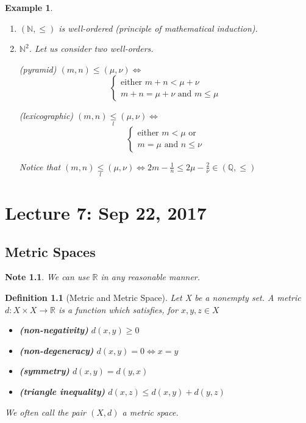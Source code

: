 \documentclass[11pt, oneside]{book}
\theoremstyle{break}
\newtheorem*{note}{Note}
\newtheorem{defn}{Definition}[section]
\newtheorem{eg}{Example}[section]
\newcommand{\bb}[1]{\mathbb{#1}}			%
\begin{document}
\begin{eg}
	\begin{enumerate}
		\item $(\bb{N}, \leq)$ is well-ordered (principle of mathematical induction).
		\item $\bb{N}^2$. Let us consider two well-orders.

			(pyramid) $(m, n) \leq (\mu, \nu) \iff$
			\begin{equation}
				\begin{cases}
					\text{either $m + n < \mu + \nu$} \\
					m + n = \mu + \nu \text{ and } m \leq \mu
				\end{cases}	
			\end{equation}
			
			(lexicographic) $(m, n) \underset{l}{\leq} (\mu, \nu) \iff$
			\begin{equation}
				\begin{cases}
					\text{either } m < \mu \text{ or } \\
					m = \mu \text{ and } n \leq \nu
				\end{cases}
			\end{equation}

			Notice that $(m, n) \underset{l}{\leq} (\mu, \nu) \iff 2m - \frac{1}{n} \leq 2 \mu - \frac{2}{\nu} \in (\bb{Q}, \leq)$
	\end{enumerate}
\end{eg}

\chapter{Lecture 7: Sep 22, 2017}\label{chp:lec7}

\section{Metric Spaces}\label{sect:metric_spaces}

\begin{note}
	We can use $\bb{R}$ in any reasonable manner.
\end{note}

\begin{defn}[Metric and Metric Space]
	Let X be a nonempty set. A metric $d : X \times X \to \bb{R}$ is a function which satisfies, for $x, y, z \in X$
	\begin{itemize}
		\item \textbf{(non-negativity)} $d(x,y) \geq 0$
		\item \textbf{(non-degeneracy)} $d(x,y) = 0 \iff x = y$
		\item \textbf{(symmetry)} $d(x,y) = d(y,x)$
		\item \textbf{(triangle inequality)} $d(x,z) \leq d(x,y) + d(y, z)$
	\end{itemize}

	We often call the pair $(X, d)$ a metric space.
\end{defn}
\end{document}
